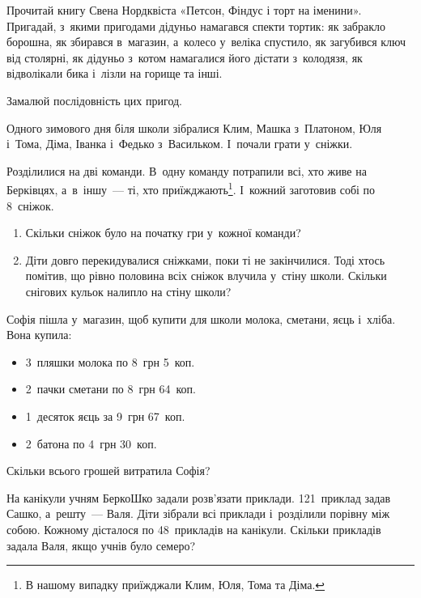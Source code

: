 \problem
Прочитай книгу Свена Нордквіста «Петсон, Фіндус і торт на іменини». Пригадай,
з~якими пригодами дідуньо намагався спекти тортик: як забракло борошна,
як збирався в~магазин, а~колесо у~веліка спустило, як загубився ключ
від столярні, як дідуньо з~котом намагалися його дістати з~колодязя,
як відволікали бика і~лізли на горище та інші.

Замалюй послідовність цих пригод.


\problem
Одного зимового дня біля школи зібралися Клим, Машка з~Платоном, Юля і~Тома,
Діма, Іванка і~Федько з~Васильком. І~почали грати у~сніжки.

Розділилися на дві команди. В~одну команду потрапили всі,
хто живе на Берківцях, а~в~іншу~--- ті, хто приїжджають\footnote{
  В нашому випадку приїжджали Клим, Юля, Тома та Діма.
}.
І~кожний заготовив собі по 8~сніжок.

\begin{enumerate}
  \item Скільки сніжок було на початку гри у~кожної команди?
  \item Діти довго перекидувалися сніжками, поки ті не закінчилися.
  Тоді хтось помітив, що рівно половина всіх сніжок влучила у~стіну школи.
  Скільки снігових кульок налипло на стіну школи?
\end{enumerate}


\problem
Софія пішла у~магазин, щоб купити для школи молока, сметани, яєць і~хліба.
Вона купила:
\begin{itemize}
  \item 3~пляшки молока по 8~грн 5~коп.
  \item 2~пачки сметани по 8~грн 64~коп.
  \item 1~десяток яєць за 9~грн 67~коп.
  \item 2~батона по 4~грн 30~коп.
\end{itemize}

Скільки всього грошей витратила Софія?


\problem
На канікули учням БеркоШко задали розв'язати приклади.
121~приклад задав Сашко, а~решту~--- Валя.
Діти зібрали всі приклади і~розділили порівну між собою.
Кожному дісталося по 48~прикладів на канікули.
Скільки прикладів задала Валя, якщо учнів було семеро?


